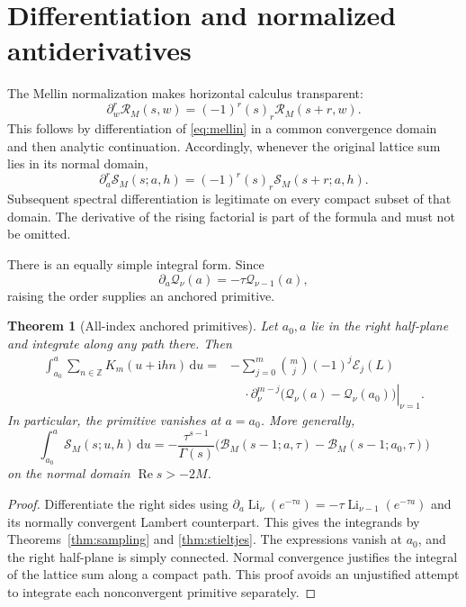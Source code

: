 \documentclass[11pt,a4paper]{article}
\numberwithin{equation}{section}
\newtheorem{theorem}{Theorem}[section]
\theoremstyle{definition}
\theoremstyle{remark}
\DeclareMathOperator{\Li}{Li}
\DeclareMathOperator{\Ree}{Re}
\newcommand{\dd}{\,\mathrm d}
\newcommand{\ii}{\mathrm i}
\newcommand{\Z}{\mathbb Z}
\newcommand{\Rcal}{\mathcal R}
\newcommand{\Bcal}{\mathcal B}
\newcommand{\Qcal}{\mathcal Q}
\newcommand{\Scal}{\mathcal S}
\newcommand{\Ecal}{\mathcal E}
\begin{document}
\section{Differentiation and normalized antiderivatives}
\label{sec:calculus}

The Mellin normalization makes horizontal calculus transparent:
\begin{equation}\label{eq:horizontal-derivative}
 \partial_w^r\Rcal_M(s,w)=(-1)^r(s)_r\Rcal_M(s+r,w).
\end{equation}
This follows by differentiation of \eqref{eq:mellin} in a common
convergence domain and then analytic continuation. Accordingly,
whenever the original lattice sum lies in its normal domain,
\begin{equation}\label{eq:lattice-derivative}
 \partial_a^r\Scal_M(s;a,h)=(-1)^r(s)_r\Scal_M(s+r;a,h).
\end{equation}
Subsequent spectral differentiation is legitimate on every compact
subset of that domain. The derivative of the rising factorial is
part of the formula and must not be omitted.

There is an equally simple integral form. Since
\begin{equation}\label{eq:Q-derivative}
 \partial_a\Qcal_\nu(a)=-\tau\Qcal_{\nu-1}(a),
\end{equation}
raising the order supplies an anchored primitive.

\begin{theorem}[All-index anchored primitives]\label{thm:primitives}
Let $a_0,a$ lie in the right half-plane and integrate along any path
there. Then
\begin{equation}\label{eq:primitive-stieltjes}
 \begin{split}
 \int_{a_0}^a\sum_{n\in\Z}K_m(u+\ii hn)\dd u
 ={}&-\sum_{j=0}^m\binom mj(-1)^j\Ecal_j(L)\\
 &\quad\cdot\left.
 \partial_\nu^{m-j}\bigl(\Qcal_\nu(a)-\Qcal_\nu(a_0)\bigr)
 \right|_{\nu=1}.
 \end{split}
\end{equation}
In particular, the primitive vanishes at $a=a_0$. More generally,
\begin{equation}\label{eq:primitive-spectral}
 \int_{a_0}^a\Scal_M(s;u,h)\dd u
 =-\frac{\tau^{s-1}}{\Gamma(s)}
       \bigl(\Bcal_M(s-1;a,\tau)-\Bcal_M(s-1;a_0,\tau)\bigr)
\end{equation}
on the normal domain $\Ree s>-2M$.
\end{theorem}
\begin{proof}
Differentiate the right sides using
$\partial_a\Li_\nu(e^{-\tau a})=-\tau\Li_{\nu-1}(e^{-\tau a})$
and its normally convergent Lambert counterpart. This gives the
integrands by Theorems~\ref{thm:sampling} and \ref{thm:stieltjes}.
The expressions vanish at $a_0$, and the right half-plane is simply
connected. Normal convergence justifies the integral of the lattice
sum along a compact path. This proof avoids an unjustified attempt
to integrate each nonconvergent primitive separately.
\end{proof}
\end{document}
